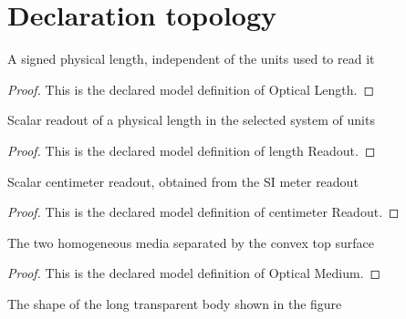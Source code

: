 \section{Declaration topology}
\begin{definition}
  \label{def:physics:phyx-mini-0110:phyxminiproblems-problemphyxmini0110-opticallength}
  A signed physical length, independent of the units used to read it
\end{definition}
\begin{proof}
  This is the declared model definition of Optical Length.
\end{proof}
\begin{definition}
  \label{def:physics:phyx-mini-0110:phyxminiproblems-problemphyxmini0110-lengthreadout}
  Scalar readout of a physical length in the selected system of units
\end{definition}
\begin{proof}
  This is the declared model definition of length Readout.
\end{proof}
\begin{definition}
  \label{def:physics:phyx-mini-0110:phyxminiproblems-problemphyxmini0110-centimeterreadout}
  Scalar centimeter readout, obtained from the SI meter readout
\end{definition}
\begin{proof}
  This is the declared model definition of centimeter Readout.
\end{proof}
\begin{definition}
  \label{def:physics:phyx-mini-0110:phyxminiproblems-problemphyxmini0110-opticalmedium}
  The two homogeneous media separated by the convex top surface
\end{definition}
\begin{proof}
  This is the declared model definition of Optical Medium.
\end{proof}
\begin{definition}
  \label{def:physics:phyx-mini-0110:phyxminiproblems-problemphyxmini0110-tubebodyshape}
  The shape of the long transparent body shown in the figure
\end{definition}
